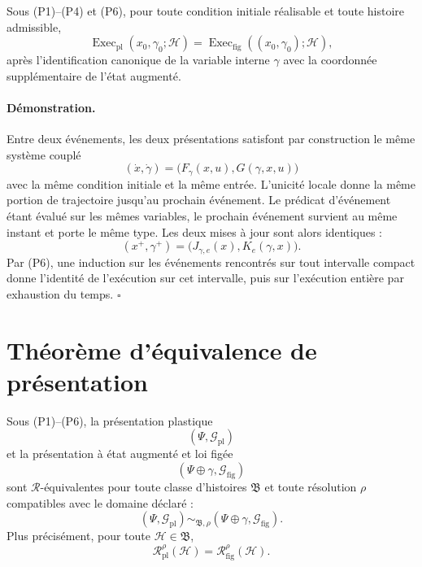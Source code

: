 \begin{encadre}[title={Lemme \theproposition{} --- Identité des exécutions}]
Sous (P1)--(P4) et (P6), pour toute condition initiale réalisable et toute
histoire admissible,
\[
\operatorname{Exec}_{\mathrm{pl}}(x_0,\gamma_0;\mathcal H)
=
\operatorname{Exec}_{\mathrm{fig}}((x_0,\gamma_0);\mathcal H),
\]
après l'identification canonique de la variable interne $\gamma$ avec la
coordonnée supplémentaire de l'état augmenté.
\end{encadre}

\paragraph{Démonstration.}
Entre deux événements, les deux présentations satisfont par construction
le même système couplé
\[
(\dot x,\dot\gamma)
=
\bigl(F_{\gamma}(x,u),G(\gamma,x,u)\bigr)
\]
avec la même condition initiale et la même entrée. L'unicité locale donne
la même portion de trajectoire jusqu'au prochain événement. Le prédicat
d'événement étant évalué sur les mêmes variables, le prochain événement
survient au même instant et porte le même type. Les deux mises à jour
sont alors identiques :
\[
(x^+,\gamma^+)
=
\bigl(J_{\gamma,e}(x),K_e(\gamma,x)\bigr).
\]
Par (P6), une induction sur les événements rencontrés sur tout intervalle
compact donne l'identité de l'exécution sur cet intervalle, puis sur
l'exécution entière par exhaustion du temps. \hfill$\square$

\section{Théorème d'équivalence de présentation}
\label{annexe-K-theoreme}

\begin{encadre}[title={Théorème \theproposition{} --- Équivalence de présentation de la plasticité}]
Sous (P1)--(P6), la présentation plastique
\[
(\Psi,\mathcal G_{\mathrm{pl}})
\]
et la présentation à état augmenté et loi figée
\[
(\Psi\oplus\gamma,\mathcal G_{\mathrm{fig}})
\]
sont $\mathcal R$-équivalentes pour toute classe d'histoires
$\mathfrak B$ et toute résolution $\rho$ compatibles avec le domaine
déclaré :
\[
(\Psi,\mathcal G_{\mathrm{pl}})
\sim_{\mathfrak B,\rho}
(\Psi\oplus\gamma,\mathcal G_{\mathrm{fig}}).
\]
Plus précisément, pour toute $\mathcal H\in\mathfrak B$,
\[
\mathcal R_{\mathrm{pl}}^{\rho}(\mathcal H)
=
\mathcal R_{\mathrm{fig}}^{\rho}(\mathcal H).
\]
\end{encadre}

